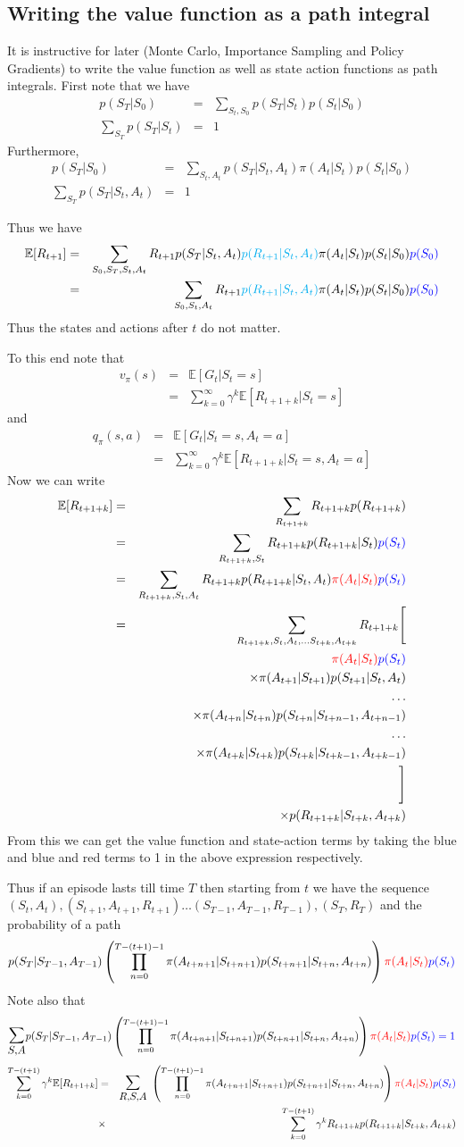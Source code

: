 \documentclass[11pt,a4paper]{article}
\newcommand\bea{\begin{eqnarray}}
\newcommand\eea{\end{eqnarray}}
\newcommand{\nn}{\nonumber \\}
\newcommand{\e}[1]{\mathbb E[#1]}
\begin{document}
\subsection{Writing the value function as a path integral} \label{Section:PathIntegral}

It is instructive for later (Monte Carlo, Importance Sampling and Policy Gradients) to write the value function as well as state action functions as path integrals. First note that we have
\bea
p(S_T|S_0) &=& \sum_{S_t,S_0} p(S_T|S_t) p(S_t|S_0) \\
\sum_{S_T} p(S_T|S_t) &=& 1
\eea
Furthermore,
\bea
p(S_T|S_0) &=& \sum_{S_t,A_t} p(S_T|S_t,A_t) \pi(A_t|S_t) p (S_t|S_0) \\
\sum_{S_T} p(S_T|S_t,A_t) &=& 1
\eea

Thus we have
\bea
\mathbb E[R_{t+1}] &=&  \sum_{S_0,S_T,S_t,A_t} R_{t+1} p(S_T|S_t,A_t) {\color{cyan} p(R_{t+1}|S_t,A_t)} \pi(A_t|S_t) p (S_t|S_0) {\color{blue} p(S_0)} \nn
&=& \sum_{S_0,S_t,A_t} R_{t+1} {\color{cyan} p(R_{t+1}|S_t,A_t)} \pi(A_t|S_t) p (S_t|S_0) {\color{blue} p(S_0)}
\eea
Thus the states and actions after $t$ do not matter.

To this end note that
\bea
v_\pi(s) &=& \e{G_t|S_t=s} \nn
&=& \sum_{k=0}^\infty \gamma^k \e{R_{t+1+k}|S_t=s}
\eea
and
\bea
q_\pi(s,a) &=& \e{G_t|S_t=s,A_t=a} \nn
&=& \sum_{k=0}^\infty \gamma^k \e{R_{t+1+k}|S_t=s,A_t=a}
\eea
Now we can write
\bea
\e{R_{t+1+k}} &=& \sum_{R_{t+1+k}} R_{t+1+k} p(R_{t+1+k}) \nn
&=& \sum_{R_{t+1+k}, S_t} R_{t+1+k} p(R_{t+1+k}| S_t) \color{blue}{p(S_t)} \nn
&=&  \sum_{R_{t+1+k}, S_t,A_t} R_{t+1+k} p(R_{t+1+k}| S_t,A_t) \color{red}{\pi(A_t|S_t)} \color{blue}{p(S_t)}  \nn
&=& \sum_{R_{t+1+k}, S_t,A_t, \dots S_{t+k}, A_{t+k}} R_{t+1+k} \Bigg[ \nn
&& \qquad \color{red}{\pi(A_t|S_t)} \color{blue}{p(S_t)} \nn
&& \qquad \times \pi(A_{t+1}|S_{t+1}) p(S_{t+1}|S_t,A_t) \nn
&& \dots \nn
&&  \qquad \times \pi(A_{t+n}|S_{t+n}) p(S_{t+n}|S_{t+n-1},A_{t+n-1}) \nn
&& \dots \nn
&&  \qquad \times \pi(A_{t+k}|S_{t+k}) p(S_{t+k}|S_{t+k-1},A_{t+k-1}) \nn
&& \Bigg]  \nn
&& \times p(R_{t+1+k}| S_{t+k},A_{t+k})
\eea
From this we can get the value function and state-action terms by taking the {\color{blue} blue} and {\color{blue}blue} and {\color{red}red} terms to 1 in the above expression respectively.


Thus if an episode lasts till time $T$ then starting from $t$ we have the sequence \nn$(S_t,A_t),(S_{t+1}, A_{t+1}, R_{t+1}) \dots (S_{T-1}, A_{T-1},R_{T-1}), (S_T,R_T)$
and
the probability of a path
\bea
p(S_T| S_{T-1},A_{T-1}) \left( \prod_{n=0}^{T-(t+1)-1} \pi(A_{t+n+1} | S_{t+n+1} ) p( S_{t+n+1} | S_{t+n}, A_{t+n}) \right) \color{red}{\pi(A_t|S_t)} \color{blue}{p(S_t)} \nn
\eea
Note also that 
\bea
\mathlarger {\mathlarger {\sum_{S,A}}} p(S_T| S_{T-1},A_{T-1}) \left( \prod_{n=0}^{T-(t+1)-1} \pi(A_{t+n+1} | S_{t+n+1} ) p( S_{t+n+1} | S_{t+n}, A_{t+n}) \right) \color{red}{\pi(A_t|S_t)} \color{blue}{p(S_t)} =1
\eea
\bea
\sum_{k=0}^{T-(t+1)} \gamma^k \mathbb E[R_{t+1+k}] &=& \mathlarger {\mathlarger {\sum_{R,S,A}}}~  \left( \prod_{n=0}^{T-(t+1)-1} \pi(A_{t+n+1} | S_{t+n+1} ) p( S_{t+n+1} | S_{t+n}, A_{t+n}) \right) \color{red}{\pi(A_t|S_t)} \color{blue}{p(S_t)} \nn
&\times& \sum_{k=0}^{T-(t+1)} \gamma^k R_{t+1+k} p(R_{t+1+k} | S_{t+k},A_{t+k})
\eea
\end{document}
